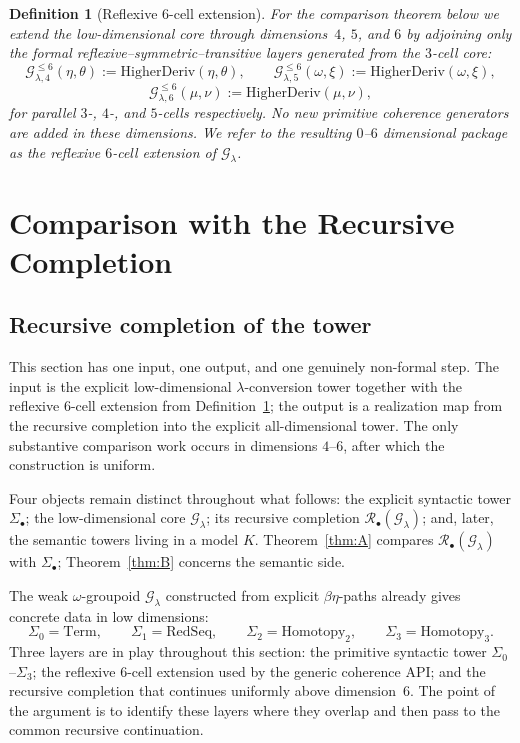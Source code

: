 \documentclass[webpdf,traditional,large,numbered]{oup-authoring-template}
\theoremstyle{thmstyleone}%
\theoremstyle{thmstyletwo}%
\theoremstyle{thmstylethree}%
\newtheorem{definition}[theorem]{Definition}
\newcommand{\ReductionSeq}{\mathrm{RedSeq}}
\newcommand{\HigherDeriv}{\mathrm{HigherDeriv}}
\begin{document}
\begin{definition}[Reflexive $6$-cell extension]\label{def:pack6}
  For the comparison theorem below we extend the low-dimensional core through
  dimensions~$4$, $5$, and $6$ by adjoining only the formal
  reflexive--symmetric--transitive layers generated from the $3$-cell core:
  \[
    \mathscr{G}^{\le 6}_{\lambda,4}(\eta,\theta):=\HigherDeriv(\eta,\theta),
    \qquad
    \mathscr{G}^{\le 6}_{\lambda,5}(\omega,\xi):=\HigherDeriv(\omega,\xi),
  \]
  \[
    \mathscr{G}^{\le 6}_{\lambda,6}(\mu,\nu):=\HigherDeriv(\mu,\nu),
  \]
  for parallel $3$-, $4$-, and $5$-cells respectively.  No new primitive
  coherence generators are added in these dimensions.  We refer to the resulting
  $0$--$6$ dimensional package as the \emph{reflexive $6$-cell extension} of
  $\mathscr{G}_\lambda$.
\end{definition}

\section{Comparison with the Recursive Completion}\label{sec:all-dim}

\subsection{Recursive completion of the tower}

This section has one input, one output, and one genuinely non-formal step.
The input is the explicit low-dimensional $\lambda$-conversion tower together
with the reflexive $6$-cell extension from
Definition~\ref{def:pack6}; the output is a realization map from the recursive
completion into the explicit all-dimensional tower.  The only substantive
comparison work occurs in dimensions $4$--$6$, after which the construction is
uniform.

Four objects remain distinct throughout what follows: the explicit syntactic
tower $\Sigma_\bullet$; the low-dimensional core $\mathscr{G}_\lambda$; its
recursive completion $\mathscr{R}_\bullet(\mathscr{G}_\lambda)$; and, later,
the semantic towers living in a model $K$.  Theorem~\ref{thm:A} compares
$\mathscr{R}_\bullet(\mathscr{G}_\lambda)$ with $\Sigma_\bullet$; Theorem~\ref{thm:B}
concerns the semantic side.

The weak $\omega$-groupoid $\mathscr{G}_\lambda$ constructed from explicit
$\beta\eta$-paths already gives concrete data in low dimensions:
\[
\Sigma_0=\mathrm{Term},\qquad
\Sigma_1=\ReductionSeq,\qquad
\Sigma_2=\mathrm{Homotopy}_2,\qquad
\Sigma_3=\mathrm{Homotopy}_3.
\]
Three layers are in play throughout this section: the primitive syntactic tower
$\Sigma_0$--$\Sigma_3$; the reflexive $6$-cell extension used by the generic
coherence API; and the recursive completion that continues uniformly above
dimension~$6$.  The point of the argument is to identify these layers where
they overlap and then pass to the common recursive continuation.
\end{document}
